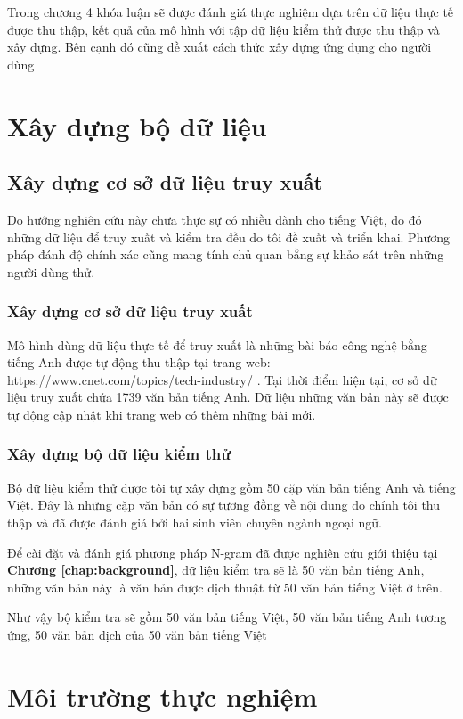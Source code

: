 \documentclass[12pt]{report}
\begin{document}
Trong chương 4 khóa luận sẽ được đánh giá thực nghiệm dựa trên dữ liệu thực tế được thu thập, kết quả của mô hình với tập dữ liệu kiểm thử được thu thập và xây dựng. Bên cạnh đó cũng đề xuất cách thức xây dựng ứng dụng cho người dùng 

\section{Xây dựng bộ dữ liệu}
\subsection{Xây dựng cơ sở dữ liệu truy xuất} 
Do hướng nghiên cứu này chưa thực sự có nhiều dành cho tiếng Việt, do đó những dữ liệu để truy xuất và kiểm tra đều do tôi đề xuất và triển khai. Phương pháp đánh độ chính xác cũng mang tính chủ quan bằng sự khảo sát trên những người dùng thử.
\subsubsection{Xây dựng cơ sở dữ liệu truy xuất}


Mô hình dùng dữ liệu thực tế để truy xuất là những bài báo công nghệ bằng tiếng Anh được tự động thu thập tại trang web:     https://www.cnet.com/topics/tech-industry/ . Tại thời điểm hiện tại, cơ sở dữ liệu truy xuất chứa 1739 văn bản tiếng Anh. Dữ liệu những văn bản này sẽ được tự động cập nhật khi trang web có thêm những bài mới.

\subsubsection{Xây dựng bộ dữ liệu kiểm thử}

Bộ dữ liệu kiểm thử được tôi tự xây dựng gồm 50 cặp văn bản tiếng Anh và tiếng Việt. Đây là những cặp văn bản có sự tương đồng về nội dung do chính tôi thu thập  và đã được đánh giá bởi hai sinh viên chuyên ngành ngoại ngữ.

Để cài đặt và đánh giá phương pháp N-gram đã được nghiên cứu giới thiệu tại \textbf{Chương \ref{chap:background}}, dữ liệu kiểm tra sẽ là 50 văn bản tiếng Anh, những văn bản này là văn bản được dịch thuật từ 50 văn bản tiếng Việt ở trên.

Như vậy bộ kiểm tra sẽ gồm 50 văn bản tiếng Việt, 50 văn bản tiếng Anh tương ứng, 50 văn bản dịch của 50 văn bản tiếng Việt


\section{Môi trường thực nghiệm}
\end{document}
